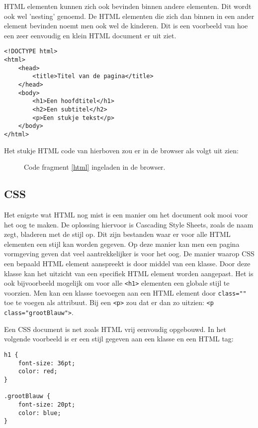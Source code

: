 HTML elementen kunnen zich ook bevinden binnen andere elementen. Dit wordt ook wel 'nesting' genoemd. De HTML elementen die zich dan binnen in een ander element bevinden noemt men ook wel de kinderen. Dit is een voorbeeld van hoe een zeer eenvoudig en klein HTML document er uit ziet.

\begin{lstlisting}[frame=single, caption=Voorbeeld van een HTML bestand, label={html}]
<!DOCTYPE html>
<html>
	<head>
		<title>Titel van de pagina</title>
	</head>
	<body>
		<h1>Een hoofdtitel</h1>
		<h2>Een subtitel</h2>
		<p>Een stukje tekst</p>
	</body>
</html>
\end{lstlisting}

Het stukje HTML code van hierboven zou er in de browser als volgt uit zien:

\begin{figure}[h]
	\centering
	\caption{Code fragment \ref{html} ingeladen in de browser.}
	\label{fig:stereoscopie}
\end{figure}

\subsection{CSS}
Het enigste wat HTML nog mist is een manier om het document ook mooi voor het oog te maken. De oplossing hiervoor is Cascading Style Sheets, zoals de naam zegt, bladeren met de stijl op. Dit zijn bestanden waar er voor alle HTML elementen een stijl kan worden gegeven. Op deze manier kan men een pagina vormgeving geven dat veel aantrekkelijker is voor het oog. De manier waarop CSS een bepaald HTML element aanspreekt is door middel van een klasse. Door deze klasse kan het uitzicht van een specifiek HTML element worden aangepast. Het is ook bijvoorbeeld mogelijk om voor alle \lstinline[basicstyle=\ttfamily\color{red}]|<h1>| elementen een globale stijl te voorzien. Men kan een klasse toevoegen aan een HTML element door \lstinline[basicstyle=\ttfamily\color{red}]|class=""| toe te voegen als attribuut. Bij een \lstinline[basicstyle=\ttfamily\color{red}]|<p>| zou dat er dan zo uitzien: \lstinline[basicstyle=\ttfamily\color{red}]|<p class="grootBlauw">|.

Een CSS document is net zoals HTML vrij eenvoudig opgebouwd. In het volgende voorbeeld is er een stijl gegeven aan een klasse en een HTML tag:

\begin{lstlisting}[frame=single, caption=Voorbeeld van een CSS bestand]
h1 {
	font-size: 36pt;
	color: red;
}

.grootBlauw {
	font-size: 20pt;
	color: blue;
}
\end{lstlisting}

